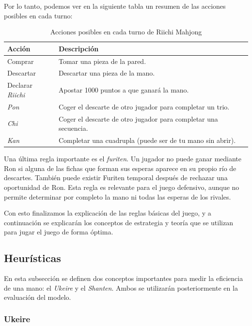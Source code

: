 Por lo tanto, podemos ver en la siguiente tabla un resumen de las acciones posibles en cada turno:

\begin{table}[H]
\centering
\begin{tabular}{|l|p{}|}
\hline
\textbf{Acción} & \textbf{Descripción} \\
\hline
\hline
Comprar & Tomar una pieza de la pared. \\
\hline
Descartar & Descartar una pieza de la mano. \\
\hline
Declarar \textit{Riichi} & Apostar 1000 puntos a que ganará la mano. \\
\hline
\textit{Pon} & Coger el descarte de otro jugador para completar un trio. \\
\hline
\textit{Chi} & Coger el descarte de otro jugador para completar una secuencia. \\
\hline
\textit{Kan} & Completar una cuadrupla (puede ser de tu mano sin abrir). \\
\hline
\end{tabular}
\caption{
Acciones posibles en cada turno de Riichi Mahjong
}
\label{tab:actions}
\end{table}

Una última regla importante es el \textit{furiten}. Un jugador no puede ganar mediante Ron si alguna de las fichas que forman sus esperas aparece en su propio río de descartes. También puede existir Furiten temporal después de rechazar una oportunidad de Ron. Esta regla es relevante para el juego defensivo, aunque no permite determinar por completo la mano ni todas las esperas de los rivales.

Con esto finalizamos la explicación de las reglas básicas del juego, y a continuación se explicarán los conceptos de estrategia y teoría que se utilizan para jugar el juego de forma óptima.

\subsection{Heurísticas}

En esta subsección se definen dos conceptos importantes para medir la eficiencia de una mano: el \textit{Ukeire} y el \textit{Shanten}. Ambos se utilizarán posteriormente en la evaluación del modelo.

\subsubsection{Ukeire}
\label{seubsec:ukeire}

